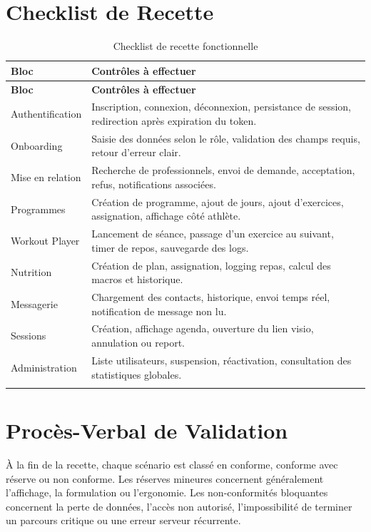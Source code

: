\section{Checklist de Recette}
\begin{longtable}{|p{5cm}|p{9.5cm}|}
\hline
\rowcolor[HTML]{DAE8FC}
\textbf{Bloc} & \textbf{Contrôles à effectuer} \\ \hline
\endfirsthead
\hline
\rowcolor[HTML]{DAE8FC}
\textbf{Bloc} & \textbf{Contrôles à effectuer} \\ \hline
\endhead
Authentification & Inscription, connexion, déconnexion, persistance de session, redirection après expiration du token. \\ \hline
Onboarding & Saisie des données selon le rôle, validation des champs requis, retour d'erreur clair. \\ \hline
Mise en relation & Recherche de professionnels, envoi de demande, acceptation, refus, notifications associées. \\ \hline
Programmes & Création de programme, ajout de jours, ajout d'exercices, assignation, affichage côté athlète. \\ \hline
Workout Player & Lancement de séance, passage d'un exercice au suivant, timer de repos, sauvegarde des logs. \\ \hline
Nutrition & Création de plan, assignation, logging repas, calcul des macros et historique. \\ \hline
Messagerie & Chargement des contacts, historique, envoi temps réel, notification de message non lu. \\ \hline
Sessions & Création, affichage agenda, ouverture du lien visio, annulation ou report. \\ \hline
Administration & Liste utilisateurs, suspension, réactivation, consultation des statistiques globales. \\ \hline
\caption{Checklist de recette fonctionnelle}
\end{longtable}

\section{Procès-Verbal de Validation}
À la fin de la recette, chaque scénario est classé en conforme, conforme avec réserve ou non conforme. Les réserves mineures concernent généralement l'affichage, la formulation ou l'ergonomie. Les non-conformités bloquantes concernent la perte de données, l'accès non autorisé, l'impossibilité de terminer un parcours critique ou une erreur serveur récurrente.

